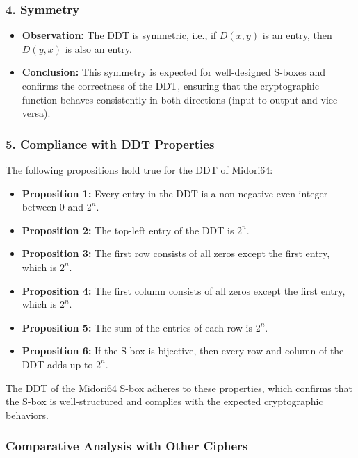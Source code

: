 \documentclass[10pt, a4paper]{article}
\begin{document}
\subsubsection*{4. Symmetry}
\begin{itemize}
	\item
	      \textbf{Observation:} The DDT is symmetric, i.e., if \( D(x, y) \) is an entry,
	      then \( D(y, x) \) is also an entry.
	\item
	      \textbf{Conclusion:} This symmetry is expected for well-designed S-boxes and
	      confirms the correctness of the DDT, ensuring that the cryptographic function
	      behaves consistently in both directions (input to output and vice versa).
\end{itemize}

\subsubsection*{5. Compliance with DDT Properties}

The following propositions hold true for the DDT of Midori64:

\begin{itemize}
	\item \textbf{Proposition 1:} Every entry in the DDT is a non-negative even
	      integer between 0 and \( 2^n \).
	\item \textbf{Proposition 2:} The top-left entry of the DDT is \( 2^n \).
	\item \textbf{Proposition 3:} The first row consists of all zeros except the
	      first entry, which is \( 2^n \).
	\item \textbf{Proposition 4:} The first column consists of all zeros except
	      the first entry, which is \( 2^n \).
	\item \textbf{Proposition 5:} The sum of the entries of each row is \( 2^n \).
	\item \textbf{Proposition 6:} If the S-box is bijective, then every row and
	      column of the DDT adds up to \( 2^n \).
\end{itemize}

The DDT of the Midori64 S-box adheres to these properties, which confirms that
the S-box is well-structured and complies with the expected cryptographic
behaviors.

\subsubsection*{Comparative Analysis with Other Ciphers}
\end{document}
